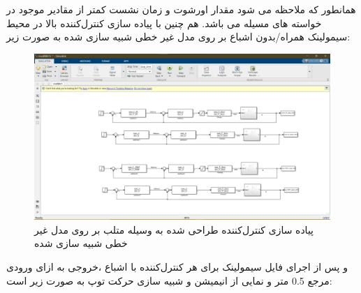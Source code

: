 همانطور که ملاحظه می شود مقدار اورشوت و زمان نشست کمتر از مقادیر موجود در خواسته های مسیله می باشد.
هم چنین با پیاده سازی کنترل‌کننده بالا در محیط سیمولینک همراه/بدون اشباع بر روی مدل غیر خطی شبیه سازی شده به صورت زیر:
\begin{figure}[H]
	\centering
	\includegraphics[width=12cm]{../Figure/P_II/simmechanic_simulink.jpg}
	\caption{پیاده سازی کنترل‌کننده طراحی شده به وسیله  متلب بر روی مدل غیر خطی شبیه سازی شده}
\end{figure}

و پس از اجرای فایل سیمولینک برای هر کنترل‌کننده با اشباع ،خروجی به ازای ورودی مرجع 0.5 متر و نمایی از انیمیشن و شبیه سازی حرکت توپ به صورت زیر است:
